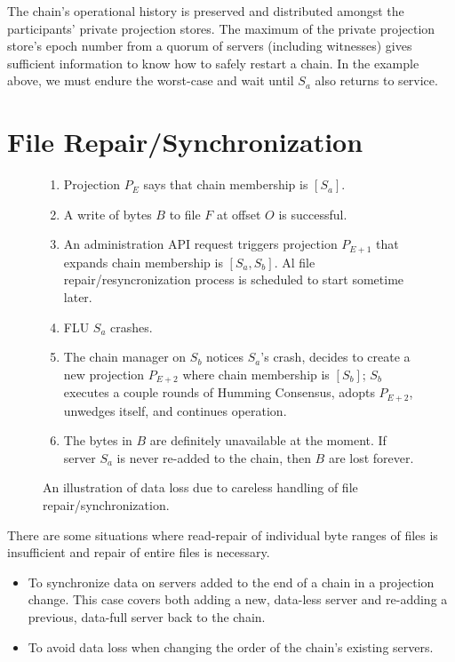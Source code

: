 \documentclass[preprint,10pt]{sigplanconf}
\begin{document}
The chain's operational history is preserved and distributed amongst
the participants' private projection stores.  The maximum of the
private projection store's epoch number from a quorum of servers
(including witnesses) gives sufficient information to know how to
safely restart a chain.  In the example above, we must endure the
worst-case and wait until $S_a$ also returns to service.

\section{File Repair/Synchronization}
\label{sec:repair-entire-files}

\begin{figure}
\begin{enumerate}
\item Projection $P_E$ says that chain membership is $[S_a]$.
\item A write of bytes $B$ to file $F$ at offset $O$ is successful.
\item An administration API request triggers projection $P_{E+1}$ that
  expands chain membership is $[S_a,S_b]$.  Al file
  repair/resyncronization process is scheduled to start sometime later.
\item FLU $S_a$ crashes.
\item The chain manager on $S_b$ notices $S_a$'s crash,
   decides to create a new projection $P_{E+2}$ where chain membership is
   $[S_b]$; $S_b$ executes a couple rounds of Humming Consensus,
   adopts $P_{E+2}$, unwedges itself, and continues operation.
\item The bytes in $B$ are definitely unavailable at the moment.
  If server $S_a$ is
  never re-added to the chain, then $B$ are lost forever.
\end{enumerate}
\caption{An illustration of data loss due to careless handling of file
repair/synchronization.}
\label{fig:data-loss2}
\end{figure}

There are some situations where read-repair of individual byte ranges
of files is insufficient and repair of entire files is necessary.

\begin{itemize}
\item To synchronize data on servers added to the end of a chain in a
  projection change.
  This case covers both
  adding a new, data-less server and re-adding a previous, data-full server
  back to the chain.
\item To avoid data loss when changing the order of the chain's
  existing servers.
\end{itemize}
\end{document}
